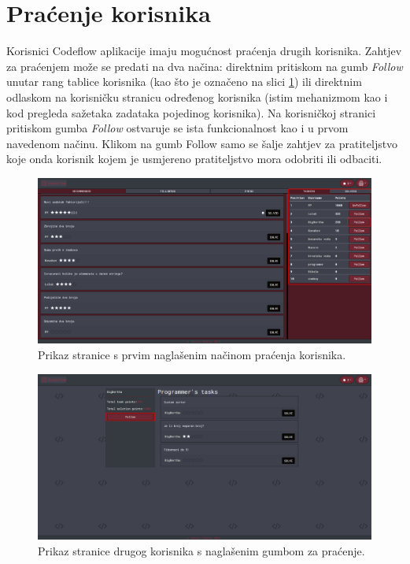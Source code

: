 \documentclass[times, utf8, zavrsni]{fer}
\begin{document}
		\section{Praćenje korisnika}
		Korisnici Codeflow aplikacije imaju mogućnost praćenja drugih korisnika. Zahtjev za praćenjem može se predati na dva načina: direktnim pritiskom na gumb \textit{Follow} unutar rang tablice korisnika (kao što je označeno na slici \ref{fig:pracenje1}) ili direktnim odlaskom na korisničku stranicu određenog korisnika (istim mehanizmom kao i kod pregleda sažetaka zadataka pojedinog korisnika). Na korisničkoj stranici pritiskom gumba \textit{Follow} ostvaruje se ista funkcionalnost kao i u prvom navedenom načinu. Klikom na gumb Follow samo se šalje zahtjev za pratiteljstvo koje onda korisnik kojem je usmjereno pratiteljstvo mora odobriti ili odbaciti.
		\begin{figure}[htb]
			\centering
			\includegraphics[width=\linewidth]{pictures/koristenje/Pracenje1.png}
			\caption{Prikaz stranice s prvim naglašenim načinom praćenja korisnika.}
			\label{fig:pracenje1}
		\end{figure}
		\begin{figure}[htb]
			\centering
			\includegraphics[width=\linewidth]{pictures/koristenje/Pracenje2.png}
			\caption{Prikaz stranice drugog korisnika s naglašenim gumbom za praćenje.}
			\label{fig:pracenje2}
		\end{figure}
	
\end{document}
